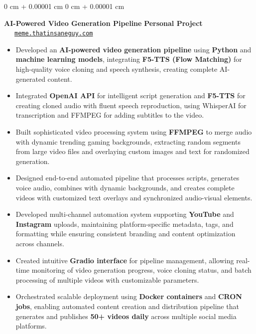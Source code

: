 \documentclass[10pt, letterpaper]{article}
\newenvironment{highlights}{
    \begin{itemize}[
        topsep=0.10 cm,
        parsep=0.10 cm,
        partopsep=0pt,
        itemsep=0pt,
        leftmargin=0 cm + 10pt
    ]
}{
    \end{itemize}
} %
\newenvironment{onecolentry}{
    \begin{adjustwidth}{
        0 cm + 0.00001 cm
    }{
        0 cm + 0.00001 cm
    }
}{
    \end{adjustwidth}
} %
\begin{document}
\vspace{0.15 cm}

\begin{onecolentry}
	\textbf{AI-Powered Video Generation Pipeline} \hfill \textbf{Personal Project} \ \ \ \href{http://meme.thatinsaneguy.com/}{\texttt{meme.thatinsaneguy.com}}
	\begin{highlights}
		\item Developed an \textbf{AI-powered video generation pipeline} using \textbf{Python} and \textbf{machine learning models}, integrating \textbf{F5-TTS (Flow Matching)} for high-quality voice cloning and speech synthesis, creating complete AI-generated content.
		\item Integrated \textbf{OpenAI API} for intelligent script generation and \textbf{F5-TTS} for creating cloned audio with fluent speech reproduction, using WhisperAI for transcription and FFMPEG for adding subtitles to the video.
		\item Built sophisticated video processing system using \textbf{FFMPEG} to merge audio with dynamic trending gaming backgrounds, extracting random segments from large video files and overlaying custom images and text for randomized generation.
		\item Designed end-to-end automated pipeline that processes scripts, generates voice audio, combines with dynamic backgrounds, and creates complete videos with customized text overlays and synchronized audio-visual elements.
		\item Developed multi-channel automation system supporting \textbf{YouTube} and \textbf{Instagram} uploads, maintaining platform-specific metadata, tags, and formatting while ensuring consistent branding and content optimization across channels.
		\item Created intuitive \textbf{Gradio interface} for pipeline management, allowing real-time monitoring of video generation progress, voice cloning status, and batch processing of multiple videos with customizable parameters.
		\item Orchestrated scalable deployment using \textbf{Docker containers} and \textbf{CRON jobs}, enabling automated content creation and distribution pipeline that generates and publishes \textbf{50+ videos daily} across multiple social media platforms.
	\end{highlights}
\end{onecolentry}

\vspace{0.15 cm}
\end{document}
